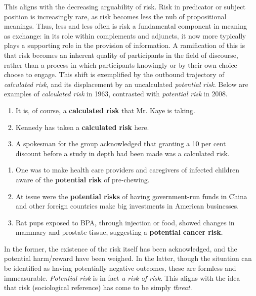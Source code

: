         This aligns with the decreasing arguability of risk. Risk in predicator or subject position is increasingly rare, as risk becomes less the nub of propositional meanings. Thus, less and less often is risk a fundamental component in meaning as exchange: in its role within complements and adjuncts, it now more typically plays a supporting role in the provision of information. A ramification of this is that risk becomes an inherent quality of participants in the field of discourse, rather than a process in which participants knowingly or by their own choice choose to engage. This shift is exemplified by the outbound trajectory of \emph{calculated risk}, and its displacement by an uncalculated \emph{potential risk}. Below are examples of \emph{calculated risk} in 1963, contrasted with \emph{potential risk} in 2008.

        \begin{enumerate}   [before=\itshape,font=\normalfont] \setlength\itemsep{0em} \small
            \item It is, of course, a \textbf{calculated risk} that Mr. Kaye is taking.
            \item Kennedy has taken a \textbf{calculated risk} here.
            \item A spokesman for the group acknowledged that granting a 10 per cent discount before a study in depth had been made was a calculated risk.
        \end{enumerate}

        \begin{enumerate}   [before=\itshape,font=\normalfont] \setlength\itemsep{0em} \small
            \item One was to make health care providers and caregivers of infected children aware of the \textbf{potential risk} of pre-chewing.
            \item At issue were the \textbf{potential risks} of having government-run funds in China and other foreign countries make big investments in American businesses.
            \item Rat pups exposed to BPA, through injection or food, showed changes in mammary and prostate tissue, suggesting a \textbf{potential cancer risk}.
        \end{enumerate}

        In the former, the existence of the risk itself has been acknowledged, and the potential harm\slash reward have been weighed. In the latter, though the situation can be identified as having potentially negative outcomes, these are formless and immeasurable. \emph{Potential risk} is in fact \emph{a risk of risk}. This aligns with the idea that risk (sociological reference) has come to be simply \emph{threat}.

